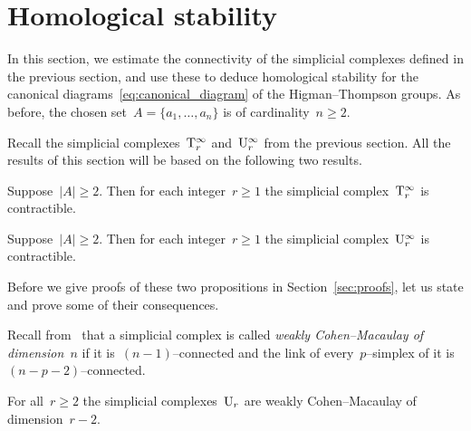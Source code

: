 

\section{Homological stability}\label{sec:connectivity}

In this section, we estimate the connectivity of the simplicial complexes defined in the previous section, and use these to deduce homological stability for the canonical diagrams~\eqref{eq:canonical_diagram} of the Higman--Thompson groups. As before, the chosen set~$A=\{a_1,\dots,a_n\}$ is of cardinality~$n\ge 2$. 


Recall the simplicial complexes~$\mathrm{T}_r^\infty$ and~$\mathrm{U}_r^\infty$ from the previous section. 
All the results of this section  will be based on the following two results. 

\begin{prop}\label{contract1}
Suppose~$|A|\ge 2$. Then for each integer~$r\geqslant1$ the simplicial complex~$\mathrm{T}_r^\infty$ is contractible. 
\end{prop}

\begin{prop}\label{contract2}
Suppose~$|A|\ge 2$. Then for each integer~$r\geqslant1$ the simplicial complex~$\mathrm{U}^\infty_r$ is contractible. 
\end{prop}

Before we give proofs of these two propositions in Section~\ref{sec:proofs}, let us state and prove some of their consequences. 




Recall from~\cite[Def.~3.4]{Hatcher+Wahl} that a simplicial complex is called {\em weakly Cohen--Macaulay of dimension~$n$} if it is~$(n-1)$--connected and the link of every~$p$--simplex of it is~$(n-p-2)$--connected. 

\begin{cor}\label{wCM}
For all~$r\geqslant2$ the simplicial complexes~$\mathrm{U}_r$ are weakly Cohen--Macaulay of dimension~\hbox{$r-2$}. 
\end{cor}

